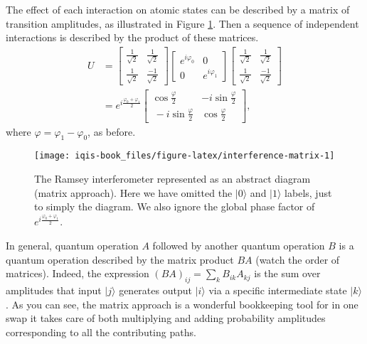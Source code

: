 \documentclass[fleqn]{article}
\begin{document}
The effect of each interaction on atomic states can be described by a matrix of transition amplitudes, as illustrated in Figure \ref{fig:interference-matrix}.
Then a sequence of independent interactions is described by the product of these matrices.
\[
  \begin{aligned}
    U &=
    \begin{bmatrix}
      \frac{1}{\sqrt2} & \frac{1}{\sqrt2}
    \\\frac{1}{\sqrt2} & \frac{-1}{\sqrt2}
    \end{bmatrix}
    \begin{bmatrix}
      e^{i\varphi_0} & 0
    \\0 & e^{i\varphi_1}
    \end{bmatrix}
    \begin{bmatrix}
      \frac{1}{\sqrt2} & \frac{1}{\sqrt2}
    \\\frac{1}{\sqrt2} & \frac{-1}{\sqrt2}
    \end{bmatrix}
  \\&= e^{i\frac{\varphi_0+\varphi_1}{2}}
    \begin{bmatrix}
      \cos\frac{\varphi}{2} & -i\sin\frac{\varphi}{2}
    \\\ -i\sin\frac{\varphi}{2}& \cos\frac{\varphi}{2}
    \end{bmatrix},
  \end{aligned}
\]
where \(\varphi = \varphi_1-\varphi_0\), as before.



\begin{figure}[H]

{\centering \texttt{[image: iqis-book\_files/figure-latex/interference-matrix-1]} 

}

\caption{The Ramsey interferometer represented as an abstract diagram (matrix approach). Here we have omitted the \(|0\rangle\) and \(|1\rangle\) labels, just to simply the diagram. We also ignore the global phase factor of \(e^{i\frac{\varphi_0+\varphi_1}{2}}\).}\label{fig:interference-matrix}
\end{figure}

In general, quantum operation \(A\) followed by another quantum operation \(B\) is a quantum operation described by the matrix product \(BA\) (watch the order of matrices).
Indeed, the expression \((BA)_{ij}=\sum_k B_{ik}A_{kj}\) is the sum over amplitudes that input \(|j\rangle\) generates output \(|i\rangle\) via a specific intermediate state \(|k\rangle\).
As you can see, the matrix approach is a wonderful bookkeeping tool for in one swap it takes care of both multiplying and adding probability amplitudes corresponding to all the contributing paths.
\end{document}
